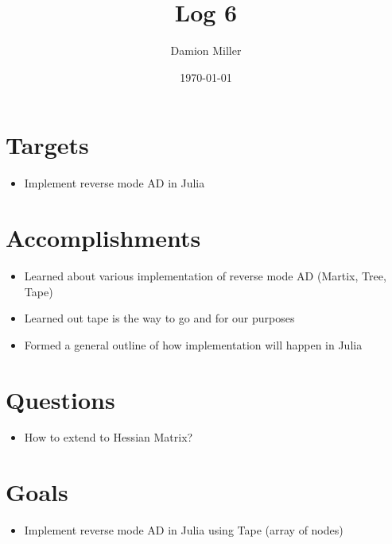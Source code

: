 \documentclass[12pt, letterpaper]{article}
\title{Log 6}
\author{Damion Miller}
\date{\today}
\begin{document}
\maketitle
\section*{Targets}
\begin{itemize}
\item Implement reverse mode AD in Julia
\end{itemize}

\section*{Accomplishments}
\begin{itemize}
\item Learned about various implementation of reverse mode AD (Martix, Tree, Tape)
\item Learned out tape is the way to go and for our purposes
\item Formed a general outline of how implementation will happen in Julia
\end{itemize}

\section*{Questions}
\begin{itemize}
\item How to extend to Hessian Matrix?
\end{itemize}

\section*{Goals}
\begin{itemize}
\item Implement reverse mode AD in Julia using Tape (array of nodes)
\end{itemize}
\end{document}
